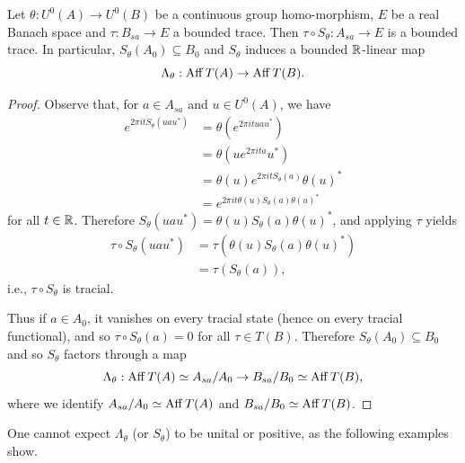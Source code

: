 \documentclass[12pt]{amsart}
\begin{document}
\begin{prop}\label{prop:induced-aff-map}
Let $\theta: U^0(A) \to U^0(B)$ be a continuous group homo\hyp{}morphism, $E$ be a real Banach space and $\tau: B_{sa} \to E$ a bounded trace. Then $\tau \circ S_\theta: A_{sa} \to E$ is a bounded trace. In particular, $S_\theta(A_0) \subseteq B_0$ and $S_\theta$ induces a bounded $\mathbb{R}$-linear map
\begin{equation}
\Lambda_\theta: \operatorname{Aff} T(A) \to \operatorname{Aff} T(B).
\end{equation}
\begin{proof}
Observe that, for $a \in A_{sa}$ and $u \in U^0(A)$, we have
\begin{equation}
\begin{split}
e^{2\pi i t S_\theta(uau^*)} &= \theta(e^{2\pi i t uau^*}) \\
&= \theta(ue^{2\pi i t a}u^*) \\\
&= \theta(u)e^{2\pi i t S_\theta(a)}\theta(u)^* \\
&= e^{2\pi i t \theta(u)S_\theta(a)\theta(u)^*}
\end{split}
\end{equation}
for all $t \in \mathbb{R}$. Therefore $S_\theta(uau^*) = \theta(u)S_\theta(a)\theta(u)^*$, and applying $\tau$ yields
\begin{equation}
\begin{split}
\tau \circ S_\theta(uau^*)  &= \tau\left(\theta(u)S_\theta(a)\theta(u)^*\right) \\
&= \tau ( S_\theta(a)),
\end{split}
\end{equation}
i.e., $\tau \circ S_\theta$ is tracial.

Thus if $a \in A_0$, it vanishes on every tracial state (hence on every tracial functional), and so $\tau \circ S_\theta(a) = 0$ for all $\tau \in T(B)$. Therefore $S_\theta(A_0) \subseteq B_0$ and so $S_\theta$ factors through a map
\begin{equation}
\Lambda_\theta: \operatorname{Aff} T(A) \simeq A_{sa}/A_0 \to B_{sa}/B_0 \simeq \operatorname{Aff} T(B),
\end{equation}
where we identify $A_{sa}/A_0 \simeq \operatorname{Aff} T(A)$ and $B_{sa}/B_0 \simeq \operatorname{Aff} T(B)$. 
\end{proof}
\end{prop}

One cannot expect $\Lambda_\theta$ (or $S_\theta$) to be unital or positive, as the following examples show. 
\end{document}
